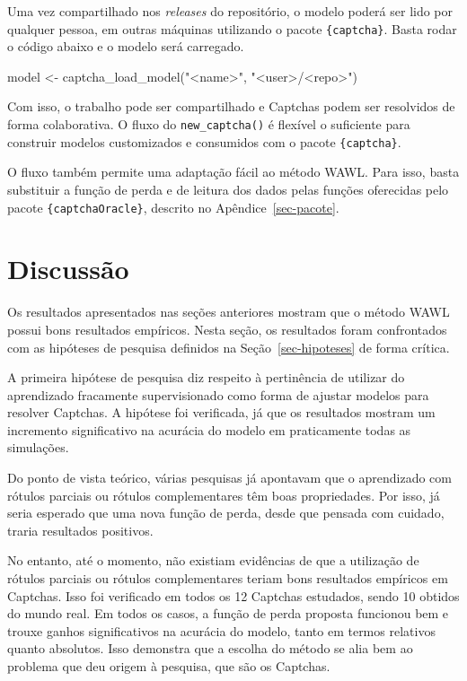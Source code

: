 \documentclass[12pt,twoside,brazilian]{book}
\newenvironment{Shaded}{\begin{snugshade}}{\end{snugshade}}
\newcommand{\FunctionTok}[1]{\textcolor[rgb]{0.28,0.35,0.67}{#1}}
\newcommand{\NormalTok}[1]{\textcolor[rgb]{0.00,0.23,0.31}{#1}}
\newcommand{\OtherTok}[1]{\textcolor[rgb]{0.00,0.23,0.31}{#1}}
\newcommand{\StringTok}[1]{\textcolor[rgb]{0.13,0.47,0.30}{#1}}
\begin{document}
Uma vez compartilhado nos \emph{releases} do repositório, o modelo
poderá ser lido por qualquer pessoa, em outras máquinas utilizando o
pacote \texttt{\{captcha\}}. Basta rodar o código abaixo e o modelo será
carregado.

\begin{Shaded}
\begin{Highlighting}[]
\NormalTok{model }\OtherTok{\textless{}{-}} \FunctionTok{captcha\_load\_model}\NormalTok{(}\StringTok{"\textless{}name\textgreater{}"}\NormalTok{, }\StringTok{"\textless{}user\textgreater{}/\textless{}repo\textgreater{}"}\NormalTok{)}
\end{Highlighting}
\end{Shaded}

Com isso, o trabalho pode ser compartilhado e Captchas podem ser
resolvidos de forma colaborativa. O fluxo do \texttt{new\_captcha()} é
flexível o suficiente para construir modelos customizados e consumidos
com o pacote \texttt{\{captcha\}}.

O fluxo também permite uma adaptação fácil ao método WAWL. Para isso,
basta substituir a função de perda e de leitura dos dados pelas funções
oferecidas pelo pacote \texttt{\{captchaOracle\}}, descrito no
Apêndice~\ref{sec-pacote}.

\hypertarget{sec-discussao}{%
\section{Discussão}\label{sec-discussao}}

Os resultados apresentados nas seções anteriores mostram que o método
WAWL possui bons resultados empíricos. Nesta seção, os resultados foram
confrontados com as hipóteses de pesquisa definidos na
Seção~\ref{sec-hipoteses} de forma crítica.

A primeira hipótese de pesquisa diz respeito à pertinência de utilizar
do aprendizado fracamente supervisionado como forma de ajustar modelos
para resolver Captchas. A hipótese foi verificada, já que os resultados
mostram um incremento significativo na acurácia do modelo em
praticamente todas as simulações.

Do ponto de vista teórico, várias pesquisas já apontavam que o
aprendizado com rótulos parciais ou rótulos complementares têm boas
propriedades. Por isso, já seria esperado que uma nova função de perda,
desde que pensada com cuidado, traria resultados positivos.

No entanto, até o momento, não existiam evidências de que a utilização
de rótulos parciais ou rótulos complementares teriam bons resultados
empíricos em Captchas. Isso foi verificado em todos os 12 Captchas
estudados, sendo 10 obtidos do mundo real. Em todos os casos, a função
de perda proposta funcionou bem e trouxe ganhos significativos na
acurácia do modelo, tanto em termos relativos quanto absolutos. Isso
demonstra que a escolha do método se alia bem ao problema que deu origem
à pesquisa, que são os Captchas.
\end{document}
